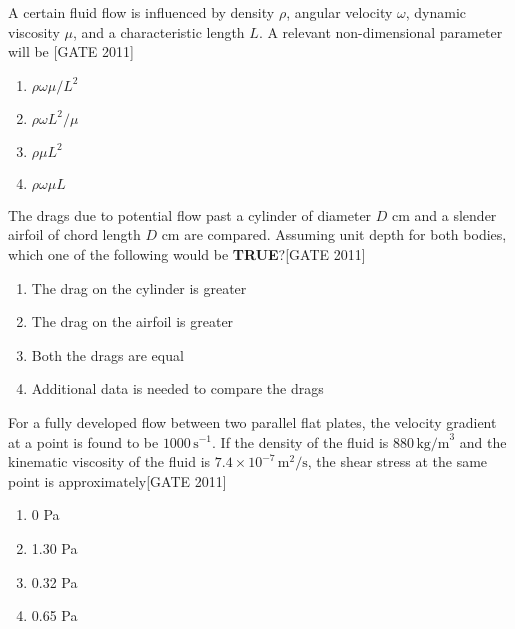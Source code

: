 \iffalse
\title{2011-XE}
\author{EE24BTECH11020 -  Ellanti Rohith}
\section{xe}
\chapter{2011}
\fi
   \item A certain fluid flow is influenced by density $\rho$, angular velocity $\omega$, dynamic viscosity $\mu$, and a characteristic length $L$. A relevant non-dimensional parameter will be \hfill{[GATE 2011]}
    \begin{multicols}{4}
    \begin{enumerate}
        \item $\rho \omega \mu / L^2$
        \item $\rho \omega L^2 / \mu$
        \item $\rho \mu L^2$
        \item $\rho \omega \mu L$
    \end{enumerate}
    \end{multicols}
    
\item The drags due to potential flow past a cylinder of diameter $D$ cm and a slender airfoil of chord length $D$ cm are compared. Assuming unit depth for both bodies, which one of the following would be \textbf{TRUE}?\hfill{[GATE 2011]}
    
    \begin{enumerate}
        \item The drag on the cylinder is greater
        \item The drag on the airfoil is greater
        \item Both the drags are equal
        \item Additional data is needed to compare the drags
    \end{enumerate}
        
    \item For a fully developed flow between two parallel flat plates, the velocity gradient at a point is found to be $1000 \, \text{s}^{-1}$. If the density of the fluid is $880 \, \text{kg/m}^3$ and the kinematic viscosity of the fluid is $7.4 \times 10^{-7} \, \text{m}^2/\text{s}$, the shear stress at the same point is approximately\hfill{[GATE 2011]}
    \begin{multicols}{4}
    \begin{enumerate}
        \item 0 Pa
        \item 1.30 Pa
        \item 0.32 Pa
        \item 0.65 Pa
    \end{enumerate}
    \end{multicols}
    
